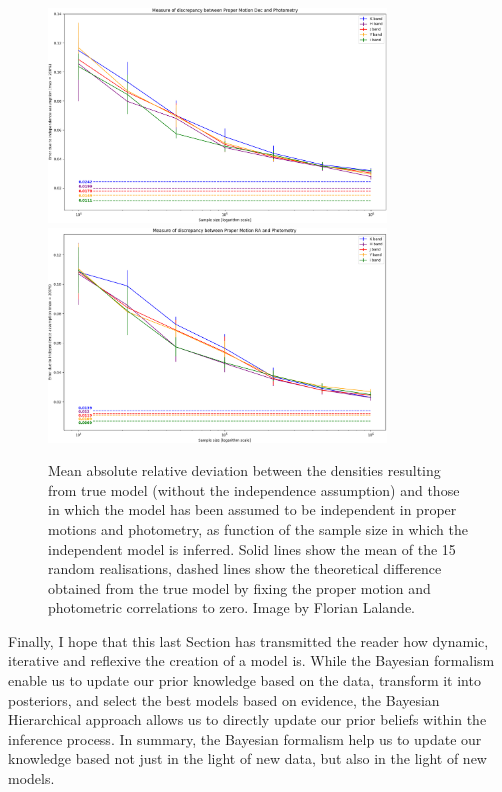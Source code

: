 \begin{figure}[ht!]
\begin{center}
\includegraphics[page=1,width=0.8\textwidth]{background/Figures/Florian1.png}
\includegraphics[page=5,width=0.8\textwidth]{background/Figures/Florian2.png}
\caption{Mean absolute relative deviation between the densities resulting from true model (without the independence assumption) and those in which the model has been assumed to be independent in proper motions and photometry, as function of the sample size in which the independent model is inferred.  Solid lines show the mean of the 15 random realisations, dashed lines show the theoretical difference obtained from the true model by fixing the proper motion and photometric correlations to zero. Image by Florian Lalande.}
\label{fig:PMPHIndep}
\end{center}
\end{figure}

Finally, I hope that this last Section has transmitted the reader how dynamic, iterative and reflexive the creation of a model is. While the Bayesian formalism enable us to update our prior knowledge based on the data, transform it into posteriors, and select the best models based on evidence, the Bayesian Hierarchical approach allows us to directly update our prior beliefs within the inference process. In summary, the Bayesian formalism help us to update our knowledge based not just in the light of new data, but also in the light of new models.
 




